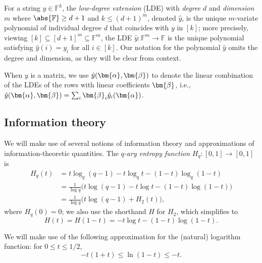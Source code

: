 \documentclass[a4paper,UKenglish,cleveref, autoref, thm-restate]{lipics-v2021}
\theoremstyle{definition}
\newcommand{\field}{\mathbb{F}}
\newcommand{\dimension}{m}
\newcommand{\degree}{d}
\def\fe#1{
    \ifnum#1=1
        \alpha
    \else
    \ifnum#1=2
        \beta
    \else
    \ifnum#1=3
        \gamma
    \fi\fi\fi
}
\begin{document}
    For a string $y \in \field^k$, the \emph{low-degree extension} (LDE) with \emph{degree} $\degree$ and \emph{dimension} $\dimension$ where $\abs{\field} \geq \degree + 1$ and $k \leq (\degree + 1)^\dimension$, denoted $\hat y$, is the unique $\dimension$-variate polynomial of individual degree $\degree$ that coincides with $y$ in $[k]$; more precisely, viewing $[k] \subseteq [\degree + 1]^\dimension \subseteq \field^\dimension$, the LDE $\hat y: \field^\dimension \to \field$ is the unique polynomial satisfying $\hat y(i) = y_i$ for all $i \in [k]$. Our notation for the polynomial $\hat y$ omits the degree and dimension, as they will be clear from context.
    
    When $y$ is a matrix, we use $\hat y(\bm{\fe1}, \bm{\fe2})$ to denote the linear combination of the LDEs of the rows with linear coefficients $\bm{\fe2}$, i.e., $\hat y(\bm{\fe1}, \bm{\fe2}) = \sum_i \bm{\fe2}_i \hat y_i(\bm{\fe1})$.

    \subsection{Information theory} We will make use of several notions of information theory and approximations of information-theoretic quantities. The \emph{$q$-ary entropy function} $H_q \colon [0,1] \to [0,1]$ is
    \begin{align}
    \label{eq:q-ary-entropy}
        H_q(t) &= t \log_q(q-1) -t \log_q t - (1 - t) \log_q(1 - t)\\
        &= \frac{1}{\log q} \big(t \log(q - 1) - t \log t - (1 - t) \log(1 - t)\big)\nonumber\\
        &= \frac{1}{\log q} \big(t \log(q - 1) + H_2(t)\big),\nonumber
    \end{align}
    where $H_q(0) = 0$; we also use the shorthand $H$ for $H_2$, which simplifies to
    \begin{equation}
    \label{eq:binary-entropy}
        H(t) = H(1 - t) = -t \log t - (1 - t) \log(1 - t).
    \end{equation}

    We will make use of the following approximation for the (natural) logarithm function: for $0 \leq t \leq 1/2$,
    \begin{equation}
    \label{eq:log-approximation}
        -t (1 + t) \leq \ln(1-t) \leq -t.
    \end{equation}
    
\end{document}
